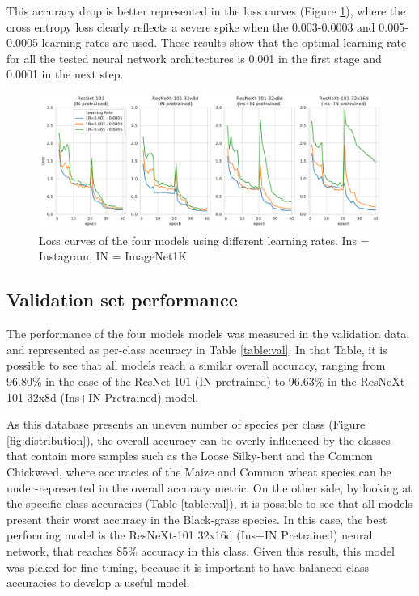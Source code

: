 \documentclass[11pt,onecolumn,titlepage,letterpaper]{article}
\begin{document}
This accuracy drop is better represented in the loss curves (Figure \ref{fig:loss}), where the cross entropy loss clearly reflects a severe spike when the 0.003-0.0003 and 0.005-0.0005 learning rates are used. These results show that the optimal learning rate for all the tested neural network architectures is 0.001 in the first stage and 0.0001 in the next step.

\begin{figure}[h]
	\begin{center}
		\includegraphics[width=1.0\linewidth]{loss_4models.pdf}
	\end{center}
	\caption{Loss curves of the four models using different learning rates. Ins = Instagram, IN = ImageNet1K}
	\label{fig:loss}
\end{figure}

\subsection{Validation set performance}

The performance of the four models models was measured in the validation data, and represented as per-class accuracy in Table \ref{table:val}. In that Table, it is possible to see that all models reach a similar overall accuracy, ranging from 96.80\% in the case of the ResNet-101 (IN pretrained) to 96.63\% in the ResNeXt-101 32x8d (Ins+IN Pretrained) model.

As this database presents an uneven number of species per class (Figure \ref{fig:distribution}), the overall accuracy can be overly influenced by the classes that contain more samples such as the Loose Silky-bent and the Common Chickweed, where accuracies of the Maize and Common wheat species can be under-represented in the overall accuracy metric. On the other side, by looking at the specific class accuracies (Table \ref{table:val}), it is possible to see that all models present their worst accuracy in the Black-grass species. In this case, the best performing model is the ResNeXt-101 32x16d (Ins+IN Pretrained) neural network, that reaches 85\% accuracy in this class. Given this result, this model was picked for fine-tuning, because it is important to have balanced class accuracies to develop a useful model.
\end{document}
